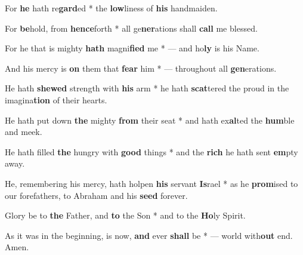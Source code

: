 \begin{multicols}{2}
	For \textbf{he} hath re\textbf{gard}ed * the \textbf{low}liness of \textbf{his} handmaiden.
	
	For \textbf{be}hold, from \textbf{hence}forth * all ge\textbf{ner}ations shall \textbf{call} me blessed.
	
	For he that is mighty \textbf{hath} magni\textbf{fied} me * --- and ho\textbf{ly} is his Name.
	
	And his mercy is \textbf{on} them that \textbf{fear} him * --- throughout all \textbf{gen}erations.
	
	He hath \textbf{shewed} strength with \textbf{his} arm * he hath \textbf{scat}tered the proud in the imagina\textbf{tion} of their hearts.
	
	He hath put down \textbf{the} mighty \textbf{from} their seat * and hath ex\textbf{al}ted the \textbf{hum}ble and meek.
	
	He hath filled \textbf{the} hungry with \textbf{good} things * and the \textbf{rich} he hath sent \textbf{em}pty away.
	
	He, remembering his mercy, hath holpen \textbf{his} servant \textbf{Is}rael * as he \textbf{prom}ised to our forefathers, to Abraham and his \textbf{seed} forever.
	
	Glory be to \textbf{the} Father, and \textbf{to} the Son * and to the \textbf{Ho}ly Spirit.
	
	As it was in the beginning, is now, \textbf{and} ever \textbf{shall} be * --- world with\textbf{out} end. Amen.
\end{multicols}